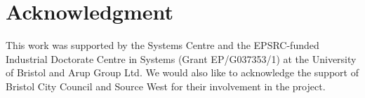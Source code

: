 \documentclass[journal]{IEEEtran}
\begin{document}



\section*{Acknowledgment}

This work was supported by the Systems Centre and the EPSRC-funded
Industrial Doctorate Centre in Systems (Grant EP/G037353/1) at the
University of Bristol and Arup Group Ltd. We would also like to
acknowledge the support of Bristol City Council and Source West for
their involvement in the project.



\ifCLASSOPTIONcaptionsoff
  \newpage
\fi







%
\end{document}
